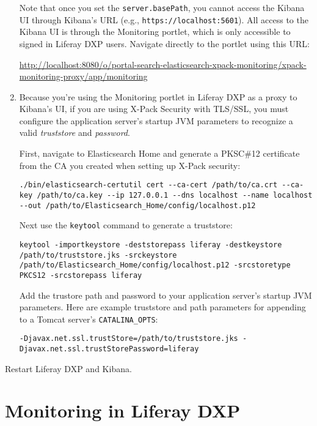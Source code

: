 \begin{enumerate}
  Note that once you set the \texttt{server.basePath}, you cannot access
  the Kibana UI through Kibana's URL (e.g.,
  \texttt{https://localhost:5601}). All access to the Kibana UI is
  through the Monitoring portlet, which is only accessible to signed in
  Liferay DXP users. Navigate directly to the portlet using this URL:

  \url{http://localhost:8080/o/portal-search-elasticsearch-xpack-monitoring/xpack-monitoring-proxy/app/monitoring}
\item
  Because you're using the Monitoring portlet in Liferay DXP as a proxy
  to Kibana's UI, if you are using X-Pack Security with TLS/SSL, you
  must configure the application server's startup JVM parameters to
  recognize a valid \emph{truststore} and \emph{password}.

  First, navigate to Elasticsearch Home and generate a PKSC\#12
  certificate from the CA you created when setting up X-Pack security:

\begin{verbatim}
./bin/elasticsearch-certutil cert --ca-cert /path/to/ca.crt --ca-key /path/to/ca.key --ip 127.0.0.1 --dns localhost --name localhost --out /path/to/Elasticsearch_Home/config/localhost.p12
\end{verbatim}

  Next use the \texttt{keytool} command to generate a truststore:

\begin{verbatim}
keytool -importkeystore -deststorepass liferay -destkeystore /path/to/truststore.jks -srckeystore /path/to/Elasticsearch_Home/config/localhost.p12 -srcstoretype PKCS12 -srcstorepass liferay
\end{verbatim}

  Add the trustore path and password to your application server's
  startup JVM parameters. Here are example truststore and path
  parameters for appending to a Tomcat server's \texttt{CATALINA\_OPTS}:

\begin{verbatim}
-Djavax.net.ssl.trustStore=/path/to/truststore.jks -Djavax.net.ssl.trustStorePassword=liferay
\end{verbatim}
\end{enumerate}

Restart Liferay DXP and Kibana.

\section{Monitoring in Liferay DXP}\label{monitoring-in-liferay-dxp}

